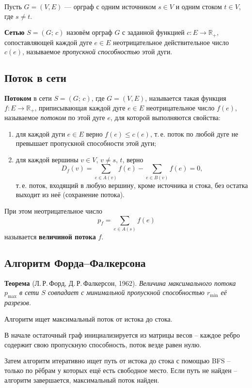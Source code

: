 Пусть $G = (V, E)$ — орграф с одним источником $s \in V$ и
одним стоком $t \in V$, где $s \neq t$.

\textbf{Сетью} $S = (G;\, c)$ назовём орграф $G$ с заданной функцией
$c : E \to \mathbb{R}_+$, сопоставляющей каждой дуге $e \in E$
неотрицательное действительное число $c(e)$, называемое
\textit{пропускной способностью} этой дуги.

\subsection{Поток в сети}

\textbf{Потоком} в сети $S = (G;\, c)$, где $G = (V, E)$, называется такая
функция $f : E \to \mathbb{R}_+$, приписывающая каждой дуге $e \in E$
неотрицательное число $f(e)$, называемое \textit{потоком} по этой
дуге $e$, для которой выполняются свойства:

\begin{enumerate}
    \item для каждой дуги $e \in E$ верно $f(e) \leqslant c(e)$,
    т.\,е. поток по любой дуге не превышает пропускной способности этой дуги;

    \item для каждой вершины $v \in V$, $v \neq s,\, t$, верно
    \[
        D_f(v) = \sum_{e \in A(v)} f(e) - \sum_{e \in B(v)} f(e) = 0,
    \]
    т.\,е. поток, входящий в любую вершину, кроме источника и стока,
    без остатка выходит из неё (сохранение потока).
\end{enumerate}

При этом неотрицательное число
\[
    p_f = \sum_{e \in A(s)} f(e)
\]
называется \textbf{величиной потока} $f$.

\subsection{Алгоритм Форда--Фалкерсона}

\textbf{Теорема} (Л.\,Р.\,Форд, Д.\,Р.\,Фалкерсон, 1962).
\textit{Величина максимального потока $p_{\max}$ в сети $S$ совпадает
с минимальной пропускной способностью $r_{\min}$ её разрезов.}

Алгоритм ищет максимальный поток от истока до стока.

В начале остаточный граф инициализируется из матрицы весов --
каждое ребро содержит свою пропускную способность, поток везде равен нулю.

Затем алгоритм итеративно ищет путь от истока до стока с помощью BFS --
только по рёбрам у которых ещё есть свободное место.
Если путь не найден -- алгоритм завершается, максимальный поток найден.

